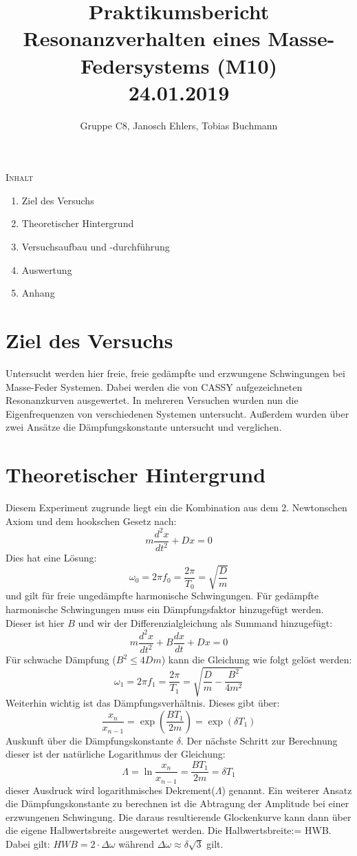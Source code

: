 \documentclass[11pt]{article}
\begin{document}
\title{Praktikumsbericht\\ Resonanzverhalten eines Masse-Federsystems (M10)\\24.01.2019}
\author{Gruppe C8, Janosch Ehlers, Tobias Buchmann}
\maketitle

\begin{center}
\textsc{Inhalt}
\end{center}
\begin{enumerate}
\item Ziel des Versuchs
\item Theoretischer Hintergrund
\item Versuchsaufbau und -durchführung
\item Auswertung
\item Anhang
\end{enumerate}

\section{Ziel des Versuchs}
Untersucht werden hier freie, freie gedämpfte und erzwungene Schwingungen bei Masse-Feder Systemen. Dabei werden die von CASSY aufgezeichneten Resonanzkurven ausgewertet. In mehreren Versuchen wurden nun die Eigenfrequenzen von verschiedenen Systemen untersucht. Außerdem wurden über zwei Ansätze die Dämpfungskonstante untersucht und verglichen.

\section{Theoretischer Hintergrund}
Diesem Experiment zugrunde liegt ein die Kombination aus dem 2. Newtonschen Axiom und dem hookschen Gesetz nach: $$m\frac{d^2x}{dt^2}+Dx=0$$ Dies hat eine Lösung: $$\omega_0=2\pi f_0=\frac{2\pi}{T_0}=\sqrt{\frac{D}{m}}$$ und gilt für freie ungedämpfte harmonische Schwingungen. Für gedämpfte harmonische Schwingungen muss ein Dämpfungsfaktor hinzugefügt werden. Dieser ist hier $B$ und wir der Differenzialgleichung als Summand hinzugefügt:$$m\frac{d^2x}{dt^2}+B\frac{dx}{dt}+Dx=0$$ Für schwache Dämpfung ($B^2\leq4Dm$) kann die Gleichung wie folgt gelöst werden:$$\omega_1=2\pi f_1=\frac{2\pi}{T_1}=\sqrt{\frac{D}{m}-\frac{B^2}{4m^2}}$$ Weiterhin wichtig ist das Dämpfungsverhältnis. Dieses gibt über: $$\frac{x_n}{x_{n-1}}=\exp(\frac{BT_1}{2m})=\exp(\delta T_1)$$ Auskunft über die Dämpfungskonstante $\delta$. Der nächste Schritt zur Berechnung dieser ist der natürliche Logarithmus der Gleichung: $$\Lambda=\ln\frac{x_n}{x_{n-1}}=\frac{BT_1}{2m}=\delta T_1$$ dieser Ausdruck wird logarithmisches Dekrement($\Lambda$) genannt. Ein weiterer Ansatz die Dämpfungskonstante zu berechnen ist die Abtragung der Amplitude bei einer erzwungenen Schwingung. Die daraus resultierende Glockenkurve kann dann über die eigene Halbwertsbreite ausgewertet werden. Die Halbwertsbreite:= HWB. Dabei gilt: $HWB = 2\cdot\Delta\omega$ während $\Delta\omega\approx\delta\sqrt{3}$ gilt.
\end{document}
